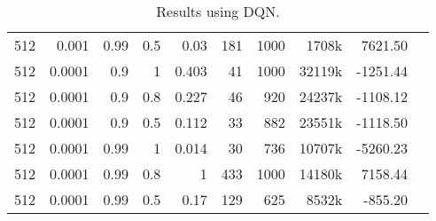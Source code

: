 \begin{table}[h]
\begin{tabular}{r r r r | r r r r r r}
			512 & 0.001 & 0.99 & 0.5 & 0.03 & 181 & 1000 & 1708k & 7621.50 \\
			512 & 0.0001 & 0.9 & 1 & 0.403 & 41 & 1000 & 32119k & -1251.44 \\
			512 & 0.0001 & 0.9 & 0.8 & 0.227 & 46 & 920 & 24237k & -1108.12 \\
			512 & 0.0001 & 0.9 & 0.5 & 0.112 & 33 & 882 & 23551k & -1118.50 \\
			512 & 0.0001 & 0.99 & 1 & 0.014 & 30 & 736 & 10707k & -5260.23 \\
			512 & 0.0001 & 0.99 & 0.8 & 1 & 433 & 1000 & 14180k & 7158.44 \\
			512 & 0.0001 & 0.99 & 0.5 & 0.17 & 129 & 625 & 8532k & -855.20 \\
		\bottomrule
	\end{tabular}
	\caption{Results using DQN.}
	\label{dqn_results}
\end{table}

